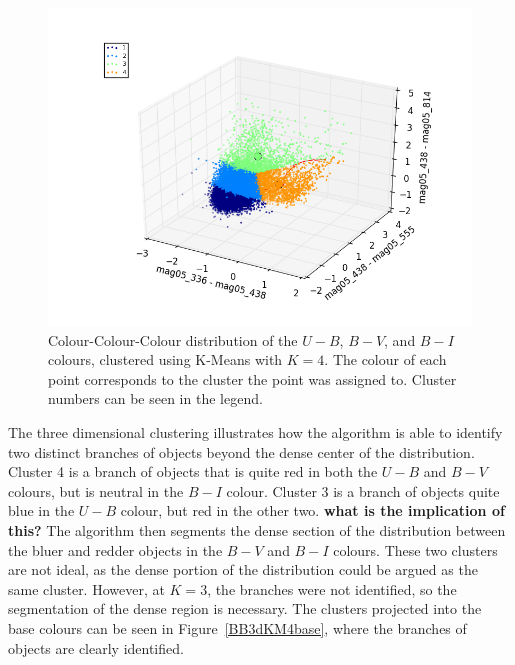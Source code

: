 \begin{figure}[H]
\centering
\includegraphics[width=\linewidth]{figs/broad/kmeans_3d_4cl_mag05_336-mag05_438vsmag05_438-mag05_555vsmag05_438-mag05_814}
\caption{Colour-Colour-Colour distribution of the $U - B$, $B - V$, and $B - I$ colours, clustered using K-Means with $K=4$. The colour of each point corresponds to the cluster the point was assigned to. Cluster numbers can be seen in the legend.}
\label{fig:BB3dKM4}
\end{figure}

The three dimensional clustering illustrates how the algorithm is able to identify two distinct branches of objects beyond the dense center of the distribution.
Cluster 4 is a branch of objects that is quite red in both the $U - B$ and $B - V$ colours, but is neutral in the $B - I$ colour.
Cluster 3 is a branch of objects quite blue in the $U - B$ colour, but red in the other two. \textbf{what is the implication of this?}
The algorithm then segments the dense section of the distribution between the bluer and redder objects in the $B - V$ and $B - I$ colours.
These two clusters are not ideal, as the dense portion of the distribution could be argued as the same cluster. 
However, at $K = 3$, the branches were not identified, so the segmentation of the dense region is necessary.
The clusters projected into the base colours can be seen in Figure~\ref{BB3dKM4base}, where the branches of objects are clearly identified.

